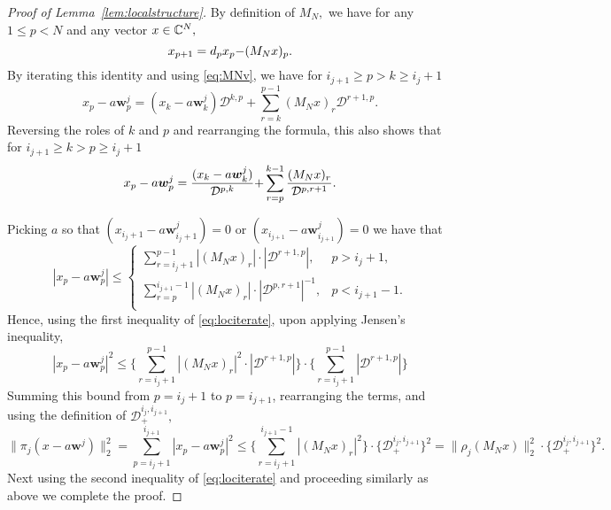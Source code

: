 \documentclass{amsart}
\numberwithin{equation}{section}
\def\corO{}
\def\corAB{}
\def\corABrev{\textcolor{black}}
\begin{document}
\begin{proof}[Proof of Lemma~\ref{lem:localstructure}]
  By definition of $M_N,$ we have for any $1 \leq p < N$ and any vector ${x}\in \mathbb{C}^N,$
  \[
    {x}_{p+1} = d_p {x}_p \corABrev{-} (M_N {x})_p.
  \]
  By iterating this identity and using \eqref{eq:MNv}, we have for $i_{j+1} \geq p > k \geq i_j + 1$
  \[
    {x}_p - a{\bm w}^{j}_p
    = ({x}_{k} - a{\bm w}^{j}_{k})\mathcal{D}^{k,p}
    +\sum_{r=k}^{p-1} (M_N {x})_r \mathcal{D}^{r+1,p}.
  \]
  Reversing the roles of $k$ and $p$ and rearranging the formula,
  this also shows that for $i_{j+1} \geq k > p \geq i_j + 1$
  \[
    {x}_p - a{\bm w}^{j}_p
    =
    \frac{
      ({x}_{k} - a{\bm w}^{j}_{k})
    }{
    \mathcal{D}^{p,k}
    }
    \corABrev{+} \sum_{r=p}^{k-1} \frac{(M_N {x})_r}{\mathcal{D}^{p,r+1}}.
  \]

  Picking \corO{$a$ so that $({x}_{i_j+1} - a{\bm w}^{j}_{i_j+1})=0$ or $({x}_{i_{j+1}} - a{\bm w}^{j}_{i_{j+1}})=0$} we have that
  \begin{equation}
    |{x}_p - \corO{a}{\bm w}^{j}_p|
    \leq
    \begin{cases}
      \sum_{r=i_j+1}^{p-1} |(M_N {x})_r| \cdot |\mathcal{D}^{r+1,p}|, & p > i_j+1, \\
      \sum_{r=p}^{i_{j+1}-1} |(M_N {x})_r| \cdot |\mathcal{D}^{p,r+1}|^{-1}, & p < i_{j+1}-1. \\
    \end{cases}
    \label{eq:lociterate}
  \end{equation}
  Hence, \corAB{using the first inequality of \eqref{eq:lociterate},} upon applying Jensen's inequality,
  \[
    |{x}_p - \corO{a{\bm w}^{j}_p}|^2
    \leq
    \biggl\{
      \sum_{r=i_j+1}^{p-1} |(M_N {x})_r|^2 \cdot |\mathcal{D}^{r+1,p}|
    \biggr\}
    \cdot
  \biggl\{
    \sum_{r=i_j+1}^{p-1} |\mathcal{D}^{r+1,p}|
  \biggr\}
  \]
  Summing this bound from $p=i_j+1$ to $p = i_{j+1}$, \corAB{rearranging the terms}, and using the definition of $\mathcal{D}_+^{i_j,i_{j+1}},$
  \[
    \|\pi_j({x}-a{\bm w}^j)\|_2^2=
    \sum_{p=i_j+1}^{i_{j+1}}
    |{x}_p - \corO{a{\bm w}^{j}_p}|^2
    \leq
    \biggl\{
      \sum_{r=i_j+1}^{i_{j+1}-1} |(M_N {x})_r|^2
    \biggr\}
    \cdot
    \biggl\{
      \mathcal{D}_+^{i_j,i_{j+1}}
    \biggr\}^2=
    \|\corAB{\rho_j}(M_N {x})\|_2^2
    \cdot
    \biggl\{
      \mathcal{D}_+^{i_j,i_{j+1}}
    \biggr\}^2 .
  \]
  \corAB{Next using the second inequality of \eqref{eq:lociterate} and proceeding similarly as above we} complete the proof.
\end{proof}
\end{document}
